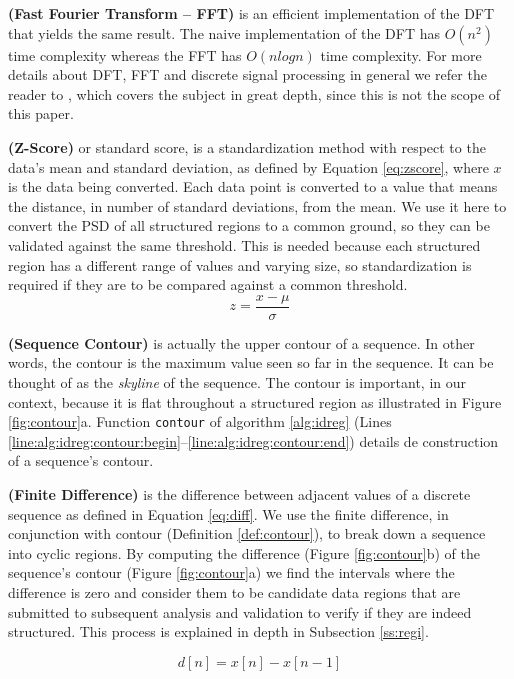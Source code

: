 \documentclass{vldb}
\begin{document}
\begin{definition}\textbf{(Fast Fourier Transform -- FFT)}\label{def:fft} is an
efficient implementation of the DFT that yields the same result. The naive implementation
of the DFT has $O(n^2)$ time complexity whereas the FFT has $O(nlogn)$ time
complexity. For more details about DFT, FFT and discrete signal
processing in general we refer the reader to \cite{oppenheim1989discrete},
which covers the subject in great depth, since this is not the scope of this
paper.
\end{definition}

\begin{definition}\textbf{(Z-Score)}\label{def:zscore} or standard
score\cite{CVeveritt2006cambridge}, is a standardization method with respect to
the data's mean and standard deviation, as defined by Equation \ref{eq:zscore},
where $x$ is the data being converted. Each data point is converted to a value
that means the distance, in number of standard deviations, from the mean.
We use it here to convert the PSD of all structured regions to a common ground, so they
can be validated against the same threshold. This is needed because each
structured region has a different range of values and varying size, so
standardization is required if they are to be compared against a common
threshold.
\begin{equation}\label{eq:zscore}
    z = \frac{x -\mu}{\sigma}
\end{equation}

\end{definition}

\begin{definition}\textbf{(Sequence Contour)}\label{def:contour} is actually the
upper contour of a sequence. In other words, the contour is the maximum value
seen so far in the sequence. It can be thought of as the \textit{skyline} of the
sequence.
The contour is important, in our context, because it is flat throughout a
structured region as illustrated in Figure \ref{fig:contour}a. Function
\texttt{contour} of algorithm \ref{alg:idreg} (Lines
\ref{line:alg:idreg:contour:begin}--\ref{line:alg:idreg:contour:end}) details de
construction of a sequence's contour.
\end{definition}

\begin{definition}\textbf{(Finite Difference)}\label{def:diff} is the difference
between adjacent values of a discrete sequence as defined in Equation
\ref{eq:diff}.
We use the finite difference, in conjunction with contour (Definition
\ref{def:contour}), to break down a sequence into cyclic regions. 
By computing the difference (Figure \ref{fig:contour}b) of the sequence's
contour (Figure \ref{fig:contour}a) we find the intervals where the difference
is zero and consider them to be candidate data regions that are submitted to
subsequent analysis and validation to verify if they are indeed structured.
This process is explained in depth in Subsection \ref{ss:regi}.

\begin{equation}\label{eq:diff}
    d[n] = x[n] - x[n - 1]
\end{equation}
\end{definition}
\end{document}
